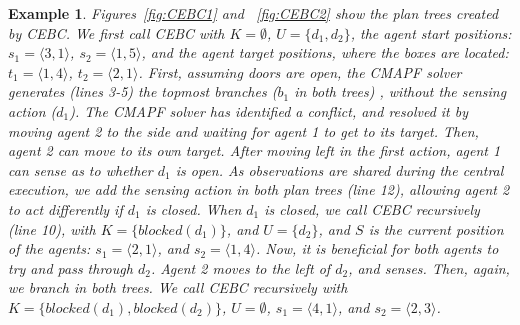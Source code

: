 \documentclass[letterpaper]{article} %
\newtheorem{exmp}{Example}
\begin{document}
\begin{exmp}
Figures~\ref{fig:CEBC1} and ~\ref{fig:CEBC2} show the plan trees created by CEBC. We first call CEBC with $K=\emptyset$, $U=\{d_1,d_2\}$,  the agent start positions: $s_1=\langle 3,1 \rangle$, $s_2=\langle 1,5 \rangle$, and the agent target positions, where the boxes are located: $t_1=\langle 1,4 \rangle$, $t_2=\langle 2,1 \rangle$.
First, assuming doors are open, the CMAPF solver generates (lines 3-5) the topmost branches ($b_1$ in both trees) , without the sensing action ($d_1$). The CMAPF solver has identified a conflict, and resolved it by moving agent 2 to the side and waiting for agent 1 to get to its target. Then, agent 2 can move to its own target.
After moving left in the first action, agent 1 can sense as to whether $d_1$ is open. As observations are shared during the central execution, we add the sensing action in both plan trees (line 12), allowing agent 2 to act differently if $d_1$ is closed. When $d_1$ is closed, we call CEBC recursively (line 10), with $K=\{blocked(d_1)\}$, and $U=\{d_2\}$, and $S$ is the current position of the agents: $s_1=\langle 2,1 \rangle$, and $s_2=\langle 1,4 \rangle$. Now, it is beneficial for both agents to try and pass through $d_2$. Agent 2 moves to the left of $d_2$, and senses. Then, again, we branch in both trees. We call CEBC recursively with $K=\{blocked(d_1),blocked(d_2)\}$, $U=\emptyset$, $s_1=\langle 4,1 \rangle$, and $s_2=\langle 2,3 \rangle$.
\end{exmp}
\end{document}
